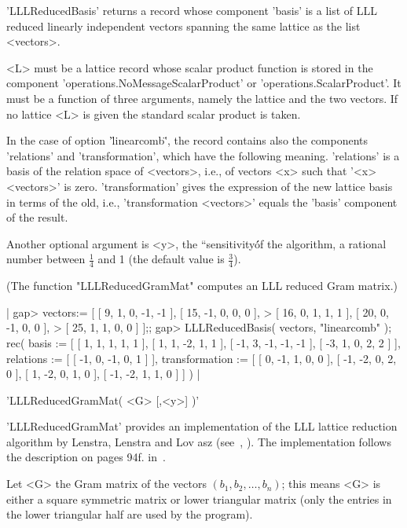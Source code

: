 'LLLReducedBasis' returns  a record whose component  'basis' is a list of
LLL reduced linearly independent vectors spanning the same lattice as the
list <vectors>.

<L> must be  a lattice record whose scalar  product function is stored in
the         component        'operations.NoMessageScalarProduct'       or
'operations.ScalarProduct'.  It  must be a  function  of three arguments,
namely the lattice and the  two vectors.  If  no lattice <L> is given the
standard scalar product is taken.

In the  case  of option '\"linearcomb\"',   the record contains  also the
components 'relations' and   'transformation', which have  the  following
meaning.   'relations' is  a basis  of the  relation  space of <vectors>,
i.e.,  of   vectors   <x>   such that   '<x>   \*  <vectors>'  is   zero.
'transformation' gives the  expression of the  new lattice basis in terms
of the old,  i.e., 'transformation   \*  <vectors>'  equals the   'basis'
component of the result.

Another optional argument is <y>, the ``sensitivity\'\' of the algorithm,
a  rational number  between $\frac{1}{4}$  and  1  (the default value  is
$\frac{3}{4}$).

(The function "LLLReducedGramMat" computes an LLL reduced Gram matrix.)

|    gap> vectors:= [ [ 9, 1, 0, -1, -1 ], [ 15, -1, 0, 0, 0 ],
    >                [ 16, 0, 1, 1, 1 ], [ 20, 0, -1, 0, 0 ],
    >                [ 25, 1, 1, 0, 0 ] ];;
    gap> LLLReducedBasis( vectors, "linearcomb" );
    rec(
      basis :=
       [ [ 1, 1, 1, 1, 1 ], [ 1, 1, -2, 1, 1 ], [ -1, 3, -1, -1, -1 ],
          [ -3, 1, 0, 2, 2 ] ],
      relations := [ [ -1, 0, -1, 0, 1 ] ],
      transformation :=
       [ [ 0, -1, 1, 0, 0 ], [ -1, -2, 0, 2, 0 ], [ 1, -2, 0, 1, 0 ],
          [ -1, -2, 1, 1, 0 ] ] ) |

%
%

'LLLReducedGramMat( <G> [,<y>] )'

'LLLReducedGramMat' provides  an   implementation  of the    LLL  lattice
reduction  algorithm by    Lenstra,   Lenstra   and Lov{    a}sz
(see~\cite{LLL82}, \cite{Poh87}).    The   implementation  follows    the
description on pages 94f. in~\cite{Coh93}.

Let <G>  the Gram matrix  of the vectors  $(b_1, b_2, \ldots, b_n)$; this
means <G> is either a square  symmetric matrix or lower triangular matrix
(only the entries in the lower triangular half are used by the program).

